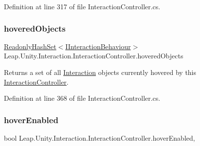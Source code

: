 Definition at line 317 of file Interaction\+Controller.\+cs.

\mbox{\label{class_leap_1_1_unity_1_1_interaction_1_1_interaction_controller_a37ded7f3535bc34b8a9c6c2337e4eb6d}} 
\subsubsection{\texorpdfstring{hoveredObjects}{hoveredObjects}}
{\footnotesize\ttfamily \mbox{\hyperlink{struct_leap_1_1_unity_1_1_readonly_hash_set}{Readonly\+Hash\+Set}}$<$\mbox{\hyperlink{interface_leap_1_1_unity_1_1_interaction_1_1_i_interaction_behaviour}{I\+Interaction\+Behaviour}}$>$ Leap.\+Unity.\+Interaction.\+Interaction\+Controller.\+hovered\+Objects\hspace{0.3cm}{\ttfamily [get]}}



Returns a set of all \mbox{\hyperlink{namespace_leap_1_1_unity_1_1_interaction}{Interaction}} objects currently hovered by this \mbox{\hyperlink{class_leap_1_1_unity_1_1_interaction_1_1_interaction_controller}{Interaction\+Controller}}. 



Definition at line 368 of file Interaction\+Controller.\+cs.

\mbox{\label{class_leap_1_1_unity_1_1_interaction_1_1_interaction_controller_a17364abc0f18966b489ee8125c0386ff}} 
\subsubsection{\texorpdfstring{hoverEnabled}{hoverEnabled}}
{\footnotesize\ttfamily bool Leap.\+Unity.\+Interaction.\+Interaction\+Controller.\+hover\+Enabled\hspace{0.3cm}{\ttfamily [get]}, {\ttfamily [set]}}



